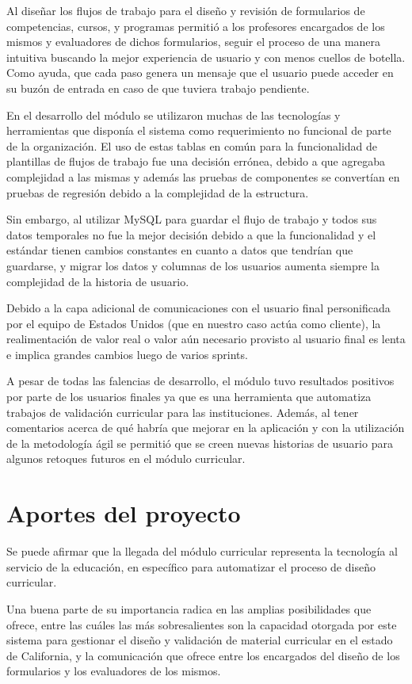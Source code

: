 Al diseñar los flujos de trabajo para el diseño y revisión de formularios de competencias, cursos, y programas permitió a los profesores encargados de los mismos y evaluadores de dichos formularios, seguir el proceso de una manera intuitiva buscando la mejor experiencia de usuario y con menos cuellos de botella. Como ayuda, que cada paso genera un mensaje que el usuario puede acceder en su buzón de entrada en caso de que tuviera trabajo pendiente.

En el desarrollo del módulo se utilizaron muchas de las tecnologías y herramientas que disponía el sistema como requerimiento no funcional de parte de la organización. El uso de estas tablas en común para la funcionalidad de plantillas de flujos de trabajo fue una decisión errónea, debido a que agregaba complejidad a las mismas y además las pruebas de componentes se convertían en pruebas de regresión debido a la complejidad de la estructura. 

Sin embargo, al utilizar MySQL para guardar el flujo de trabajo y todos sus datos temporales no fue la mejor decisión debido a que la funcionalidad y el estándar tienen cambios constantes en cuanto a datos que tendrían que guardarse, y migrar los datos y columnas de los usuarios aumenta siempre la complejidad de la historia de usuario.

Debido a la capa adicional de comunicaciones con el usuario final personificada por el equipo de Estados Unidos (que en nuestro caso actúa como cliente), la realimentación de valor real o valor aún necesario provisto al usuario final es lenta e implica grandes cambios luego de varios sprints.

A pesar de todas las falencias de desarrollo, el módulo tuvo resultados positivos por parte de los usuarios finales ya que es una herramienta que automatiza trabajos de validación curricular para las instituciones. Además, al tener comentarios acerca de qué habría que mejorar en la aplicación y con la utilización de la metodología ágil se permitió que se creen nuevas historias de usuario para algunos retoques futuros en el módulo curricular. 

\section{Aportes del proyecto}
Se puede afirmar que la llegada del módulo curricular representa la tecnología al servicio de la educación, en específico para automatizar el proceso de diseño curricular. 

Una buena parte de su importancia radica en las amplias posibilidades que ofrece, entre las cuáles las más sobresalientes son la capacidad otorgada por este sistema para gestionar el diseño y validación de material curricular en el estado de California, y la comunicación que ofrece entre los encargados del diseño de los formularios y los evaluadores de los mismos.

